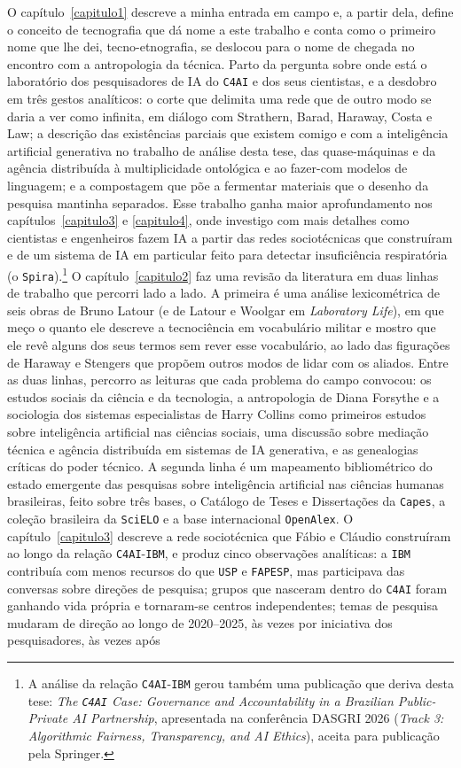 O capítulo~\ref{capitulo1} descreve a minha entrada em campo e, a partir dela, define o conceito de tecnografia que dá nome a este trabalho e conta como o primeiro nome que lhe dei, tecno-etnografia, se deslocou para o nome de chegada no encontro com a antropologia da técnica. Parto da pergunta sobre onde está o laboratório dos pesquisadores de IA do \texttt{C4AI} e dos seus cientistas, e a desdobro em três gestos analíticos: o corte que delimita uma rede que de outro modo se daria a ver como infinita, em diálogo com Strathern, Barad, Haraway, Costa e Law; a descrição das existências parciais que existem comigo e com a inteligência artificial generativa no trabalho de análise desta tese, das quase-máquinas e da agência distribuída à multiplicidade ontológica e ao fazer-com modelos de linguagem; e a compostagem que põe a fermentar materiais que o desenho da pesquisa mantinha separados. Esse trabalho ganha maior aprofundamento nos capítulos~\ref{capitulo3} e \ref{capitulo4}, onde investigo com mais detalhes como cientistas e engenheiros fazem IA a partir das redes sociotécnicas que construíram e de um sistema de IA em particular feito para detectar insuficiência respiratória (o \texttt{Spira}).\footnote{A análise da relação \texttt{C4AI}-\texttt{IBM} gerou também uma publicação que deriva desta tese: \textit{The \texttt{C4AI} Case: Governance and Accountability in a Brazilian Public-Private AI Partnership}, apresentada na conferência DASGRI 2026 (\textit{Track 3: Algorithmic Fairness, Transparency, and AI Ethics}), aceita para publicação pela Springer.} O capítulo~\ref{capitulo2} faz uma revisão da literatura em duas linhas de trabalho que percorri lado a lado. A primeira é uma análise lexicométrica de seis obras de Bruno Latour (e de Latour e Woolgar em \emph{Laboratory Life}), em que meço o quanto ele descreve a tecnociência em vocabulário militar e mostro que ele revê alguns dos seus termos sem rever esse vocabulário, ao lado das figurações de Haraway e Stengers que propõem outros modos de lidar com os aliados. Entre as duas linhas, percorro as leituras que cada problema do campo convocou: os estudos sociais da ciência e da tecnologia, a antropologia de Diana Forsythe e a sociologia dos sistemas especialistas de Harry Collins como primeiros estudos sobre inteligência artificial nas ciências sociais, uma discussão sobre mediação técnica e agência distribuída em sistemas de IA generativa, e as genealogias críticas do poder técnico. A segunda linha é um mapeamento bibliométrico do estado emergente das pesquisas sobre inteligência artificial nas ciências humanas brasileiras, feito sobre três bases, o Catálogo de Teses e Dissertações da \texttt{Capes}, a coleção brasileira da \texttt{SciELO} e a base internacional \texttt{OpenAlex}. O capítulo~\ref{capitulo3} descreve a rede sociotécnica que Fábio e Cláudio construíram ao longo da relação \texttt{C4AI}-\texttt{IBM}, e produz cinco observações analíticas: a \texttt{IBM} contribuía com menos recursos do que \texttt{USP} e \texttt{FAPESP}, mas participava das conversas sobre direções de pesquisa; grupos que nasceram dentro do \texttt{C4AI} foram ganhando vida própria e tornaram-se centros independentes; temas de pesquisa mudaram de direção ao longo de 2020--2025, às vezes por iniciativa dos pesquisadores, às vezes após 